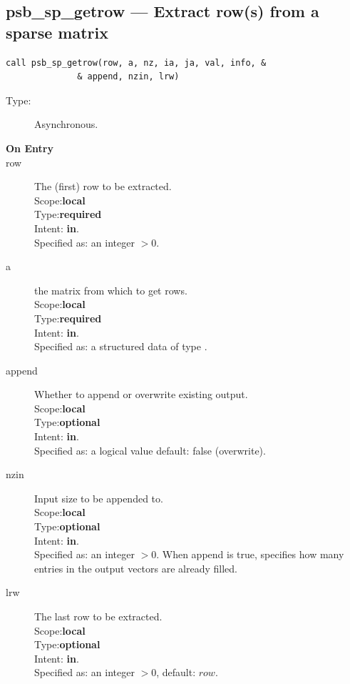 \clearpage\subsection{psb\_sp\_getrow --- Extract row(s) from a sparse
  matrix}

\begin{verbatim}
call psb_sp_getrow(row, a, nz, ia, ja, val, info, &
              & append, nzin, lrw)
\end{verbatim}

\begin{description}
\item[Type:] Asynchronous.
\item[\bf On Entry]
\item[row] The (first) row to be extracted.\\
Scope:{\bf local}\\
Type:{\bf required}\\
Intent: {\bf in}.\\
Specified as: an integer $>0$.
\item[a] the matrix from  which to get rows.\\
Scope:{\bf local}\\
Type:{\bf required}\\
Intent: {\bf in}.\\
Specified as: a structured data of type \spdata.
\item[append] Whether to append or overwrite existing output.\\
Scope:{\bf local}\\
Type:{\bf optional}\\
Intent: {\bf in}.\\
Specified as: a logical value default: false (overwrite).
\item[nzin] Input size to be appended to.\\
Scope:{\bf local}\\
Type:{\bf optional}\\
Intent: {\bf in}.\\
Specified as: an integer $>0$. When append is true, specifies how many
entries in the output vectors are already filled. 
\item[lrw] The last  row to be extracted.\\
Scope:{\bf local}\\
Type:{\bf optional}\\
Intent: {\bf in}.\\
Specified as: an integer $>0$, default: $row$.

\end{description}

